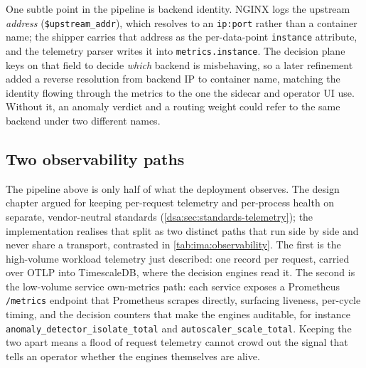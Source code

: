 One subtle point in the pipeline is backend identity. NGINX logs the upstream
\emph{address} (\texttt{\$upstream\_addr}), which resolves to an \texttt{ip:port}
rather than a container name; the shipper carries that address as the
per-data-point \texttt{instance} attribute, and the telemetry parser writes it into
\texttt{metrics.instance}. The decision plane keys on that field to decide
\emph{which} backend is misbehaving, so a later refinement added a reverse
resolution from backend IP to container name, matching the identity flowing through
the metrics to the one the sidecar and operator UI use. Without it, an anomaly
verdict and a routing weight could refer to the same backend under two different
names.

\subsection{Two observability paths}
\label{sec:ima:twopaths}

The pipeline above is only half of what the deployment observes. The design chapter
argued for keeping per-request telemetry and per-process health on separate,
vendor-neutral standards (\cref{dsa:sec:standards-telemetry}); the implementation
realises that split as two distinct paths that run side by side and never share a
transport, contrasted in \cref{tab:ima:observability}. The first is the high-volume
workload telemetry just described: one record per request, carried over OTLP into
TimescaleDB, where the decision engines read it. The second is the low-volume
service own-metrics path: each service exposes a Prometheus \texttt{/metrics}
endpoint that Prometheus scrapes directly, surfacing liveness, per-cycle timing, and
the decision counters that make the engines auditable, for instance
\texttt{anomaly\_detector\_isolate\_total} and \texttt{autoscaler\_scale\_total}.
Keeping the two apart means a flood of request telemetry cannot crowd out the signal
that tells an operator whether the engines themselves are alive.

